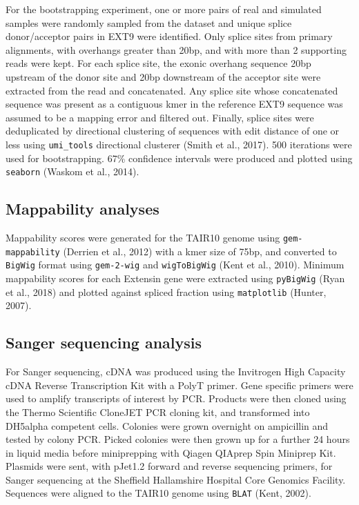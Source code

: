 \documentclass[12pt,a4paper,]{report}
\begin{document}
For the bootstrapping experiment, one or more pairs of real and
simulated samples were randomly sampled from the dataset and unique
splice donor/acceptor pairs in EXT9 were identified. Only splice sites
from primary alignments, with overhangs greater than 20bp, and with more
than 2 supporting reads were kept. For each splice site, the exonic
overhang sequence 20bp upstream of the donor site and 20bp downstream of
the acceptor site were extracted from the read and concatenated. Any
splice site whose concatenated sequence was present as a contiguous kmer
in the reference EXT9 sequence was assumed to be a mapping error and
filtered out. Finally, splice sites were deduplicated by directional
clustering of sequences with edit distance of one or less using
\texttt{umi\_tools} directional clusterer (Smith et al., 2017). 500
iterations were used for bootstrapping. 67\% confidence intervals were
produced and plotted using \texttt{seaborn} (Waskom et al., 2014).

\hypertarget{mappability-analyses}{%
\subsection{Mappability analyses}\label{mappability-analyses}}

Mappability scores were generated for the TAIR10 genome using
\texttt{gem-mappability} (Derrien et al., 2012) with a kmer size of
75bp, and converted to \texttt{BigWig} format using \texttt{gem-2-wig}
and \texttt{wigToBigWig} (Kent et al., 2010). Minimum mappability scores
for each Extensin gene were extracted using \texttt{pyBigWig} (Ryan et
al., 2018) and plotted against spliced fraction using
\texttt{matplotlib} (Hunter, 2007).

\hypertarget{sanger-sequencing-analysis}{%
\subsection{Sanger sequencing
analysis}\label{sanger-sequencing-analysis}}

For Sanger sequencing, cDNA was produced using the Invitrogen High
Capacity cDNA Reverse Transcription Kit with a PolyT primer. Gene
specific primers were used to amplify transcripts of interest by PCR.
Products were then cloned using the Thermo Scientific CloneJET PCR
cloning kit, and transformed into DH5alpha competent cells. Colonies
were grown overnight on ampicillin and tested by colony PCR. Picked
colonies were then grown up for a further 24 hours in liquid media
before miniprepping with Qiagen QIAprep Spin Miniprep Kit. Plasmids were
sent, with pJet1.2 forward and reverse sequencing primers, for Sanger
sequencing at the Sheffield Hallamshire Hospital Core Genomics Facility.
Sequences were aligned to the TAIR10 genome using \texttt{BLAT} (Kent,
2002).
\end{document}
